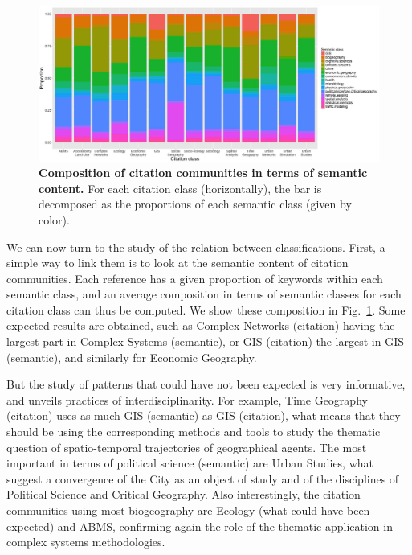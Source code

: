 \begin{figure}
\centering
\includegraphics[width=\textwidth]{figures/Fig9.jpg}
\caption{\textbf{Composition of citation communities in terms of semantic content.} For each citation class (horizontally), the bar is decomposed as the proportions of each semantic class (given by color).}
\label{fig:citationcontent}
\end{figure}


We can now turn to the study of the relation between classifications. First, a simple way to link them is to look at the semantic content of citation communities. Each reference has a given proportion of keywords within each semantic class, and an average composition in terms of semantic classes for each citation class can thus be computed. We show these composition in Fig.~\ref{fig:citationcontent}. Some expected results are obtained, such as Complex Networks (citation) having the largest part in Complex Systems (semantic), or GIS (citation) the largest in GIS (semantic), and similarly for Economic Geography.

But the study of patterns that could have not been expected is very informative, and unveils practices of interdisciplinarity. For example, Time Geography (citation) uses as much GIS (semantic) as GIS (citation), what means that they should be using the corresponding methods and tools to study the thematic question of spatio-temporal trajectories of geographical agents. The most important in terms of political science (semantic) are Urban Studies, what suggest a convergence of the City as an object of study and of the disciplines of Political Science and Critical Geography. Also interestingly, the citation communities using most biogeography are Ecology (what could have been expected) and ABMS, confirming again the role of the thematic application in complex systems methodologies.






